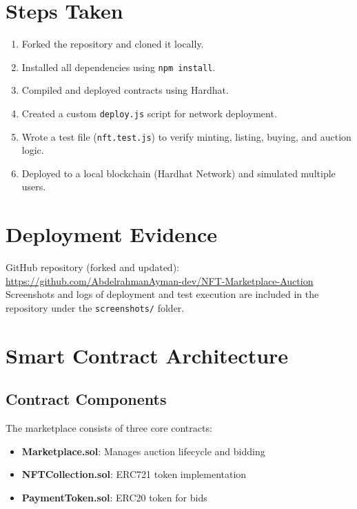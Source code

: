 \documentclass{article}
\begin{document}
\section*{Steps Taken}
\begin{enumerate}
  \item Forked the repository and cloned it locally.
  \item Installed all dependencies using \texttt{npm install}.
  \item Compiled and deployed contracts using Hardhat.
  \item Created a custom \texttt{deploy.js} script for network deployment.
  \item Wrote a test file (\texttt{nft.test.js}) to verify minting, listing, buying, and auction logic.
  \item Deployed to a local blockchain (Hardhat Network) and simulated multiple users.
\end{enumerate}

\section*{Deployment Evidence}
GitHub repository (forked and updated): \\
\url{https://github.com/AbdelrahmanAyman-dev/NFT-Marketplace-Auction} \\
Screenshots and logs of deployment and test execution are included in the repository under the \texttt{screenshots/} folder.

\section{Smart Contract Architecture}

\subsection{Contract Components}
The marketplace consists of three core contracts:

\begin{itemize}
    \item \textbf{Marketplace.sol}: Manages auction lifecycle and bidding
    \item \textbf{NFTCollection.sol}: ERC721 token implementation
    \item \textbf{PaymentToken.sol}: ERC20 token for bids
\end{itemize}
\end{document}
